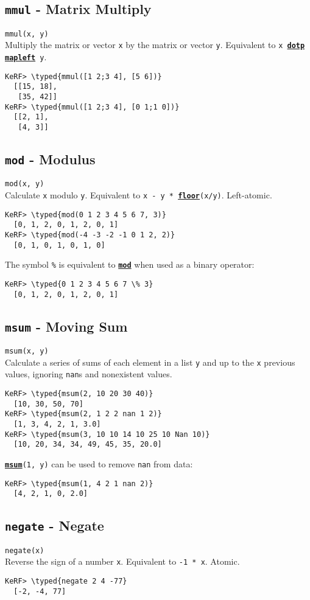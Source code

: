 \documentclass{article}
\newcommand{\typed}[1]{\textcolor{TealBlue}{#1}}
\newcommand{\primdefu}[3]{\subsection{\texttt{#1} - #2}\label{prim:#3}}
\newcommand{\primu}[2]{\hyperref[prim:#2]{\textbf{\texttt{#1}}}}
\newcommand{\primdef}[2]{\primdefu{#1}{#2}{#1}}
\newcommand{\prim}[1]{\primu{#1}{#1}}
\newcommand{\comb}[1]{\primu{#1}{#1}}
\begin{document}
\primdef{mmul}{Matrix Multiply}
\texttt{mmul(x, y)}\\

Multiply the matrix or vector \texttt{x} by the matrix or vector \texttt{y}. Equivalent to \texttt{x \prim{dotp} \comb{mapleft} y}.
\begin{Verbatim}
KeRF> \typed{mmul([1 2;3 4], [5 6])}
  [[15, 18], 
   [35, 42]]
KeRF> \typed{mmul([1 2;3 4], [0 1;1 0])}
  [[2, 1], 
   [4, 3]]
\end{Verbatim}

\primdef{mod}{Modulus}
\texttt{mod(x, y)}\\

Calculate \texttt{x} modulo \texttt{y}. Equivalent to \texttt{x - y * \prim{floor}(x/y)}. Left-atomic.
\begin{Verbatim}
KeRF> \typed{mod(0 1 2 3 4 5 6 7, 3)}
  [0, 1, 2, 0, 1, 2, 0, 1]
KeRF> \typed{mod(-4 -3 -2 -1 0 1 2, 2)}
  [0, 1, 0, 1, 0, 1, 0]
\end{Verbatim}

The symbol \texttt{\%} is equivalent to \prim{mod} when used as a binary operator:
\begin{Verbatim}
KeRF> \typed{0 1 2 3 4 5 6 7 \% 3}
  [0, 1, 2, 0, 1, 2, 0, 1]
\end{Verbatim}

\primdef{msum}{Moving Sum}
\texttt{msum(x, y)}\\

Calculate a series of sums of each element in a list \texttt{y} and up to the \texttt{x} previous values, ignoring \texttt{nan}s and nonexistent values.
\begin{Verbatim}
KeRF> \typed{msum(2, 10 20 30 40)}
  [10, 30, 50, 70]
KeRF> \typed{msum(2, 1 2 2 nan 1 2)}
  [1, 3, 4, 2, 1, 3.0]
KeRF> \typed{msum(3, 10 10 14 10 25 10 Nan 10)}
  [10, 20, 34, 34, 49, 45, 35, 20.0]
\end{Verbatim}

\texttt{\prim{msum}(1, y)} can be used to remove \texttt{nan} from data:
\begin{Verbatim}
KeRF> \typed{msum(1, 4 2 1 nan 2)}
  [4, 2, 1, 0, 2.0]
\end{Verbatim}

\pagebreak
\primdef{negate}{Negate}
\texttt{negate(x)}\\

Reverse the sign of a number \texttt{x}. Equivalent to \texttt{-1 * x}. Atomic.
\begin{Verbatim}
KeRF> \typed{negate 2 4 -77}
  [-2, -4, 77]
\end{Verbatim}
\end{document}
